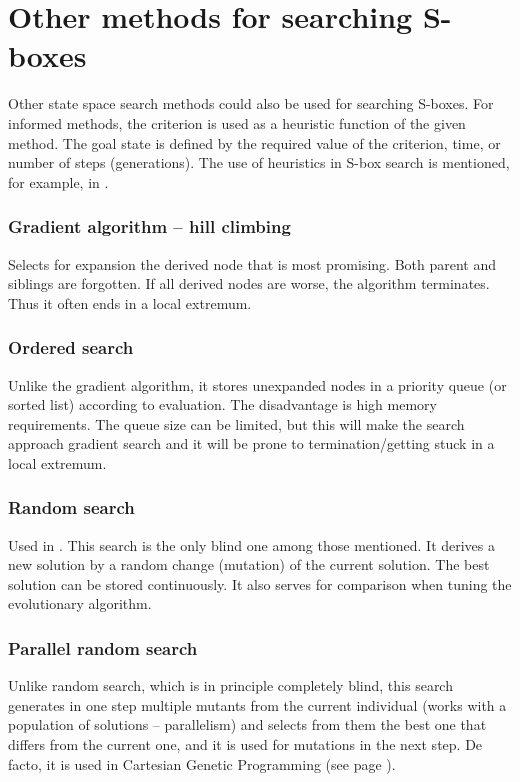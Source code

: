 \section{Other methods for searching S-boxes}
Other state space search methods could also be used for searching S-boxes.
For informed methods, the criterion is used as a heuristic function of the given method.
The goal state is defined by the required value of the criterion, time, or
number of steps (generations). The use of heuristics in S-box search is mentioned, for example,
in \cite{goodsboxes}.

\subsubsection{Gradient algorithm -- hill climbing}
Selects \cite{ui1} for expansion the derived node that is most promising. Both parent and siblings are forgotten.
If all derived nodes are worse, the algorithm terminates. Thus it often ends in a local extremum.
\subsubsection{Ordered search}
Unlike the gradient algorithm, it stores unexpanded nodes in a priority queue
(or sorted list) according to evaluation. The disadvantage is high memory requirements.
The queue size can be limited, but this will make the search approach gradient search and
it will be prone to termination/getting stuck in a local extremum.
\subsubsection{Random search}
Used in \cite{twofish}. This search is the only blind one among those mentioned.
It derives a new solution by a random change (mutation) of the current solution.
The best solution can be stored continuously. It also serves for comparison when tuning the evolutionary algorithm.
\subsubsection{Parallel random search}
Unlike random search, which is in principle completely blind,
this search generates in one step multiple mutants from the current individual
(works with a population of solutions -- parallelism) and selects from them the best one
that differs from the current one, and it is used for mutations in the next step.
De facto, it is used in Cartesian Genetic Programming
(see page \pageref{algorithmCGP}).

